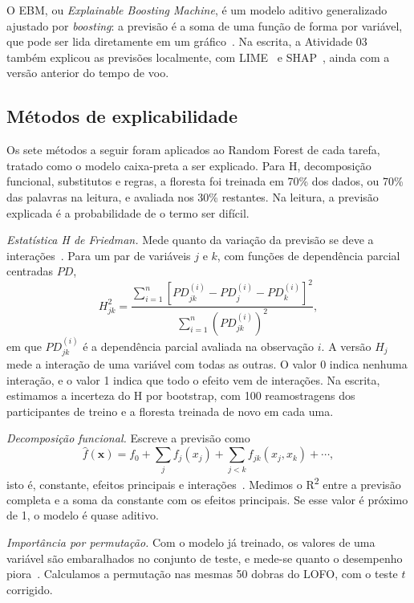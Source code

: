 \documentclass[conference]{IEEEtran}
\newcommand{\RF}{Random Forest}
\newcommand{\Rdois}{R\textsuperscript{2}}
\begin{document}
O EBM, ou \emph{Explainable Boosting Machine}, é um modelo aditivo generalizado
ajustado por \emph{boosting}: a previsão é a soma de uma função de forma por
variável, que pode ser lida diretamente em um gráfico~\cite{nori2019interpretml}.
Na escrita, a Atividade 03 também explicou as previsões localmente, com
LIME~\cite{ribeiro2016lime} e SHAP~\cite{lundberg2017shap}, ainda com a versão
anterior do tempo de voo.

\subsection{Métodos de explicabilidade}

Os sete métodos a seguir foram aplicados ao \RF{} de cada tarefa, tratado como
o modelo caixa-preta a ser explicado. Para H, decomposição funcional,
substitutos e regras, a floresta foi treinada em 70\% dos dados, ou 70\% das
palavras na leitura, e avaliada nos 30\% restantes. Na leitura, a previsão
explicada é a probabilidade de o termo ser difícil.

\emph{Estatística H de Friedman.} Mede quanto da variação da previsão se deve
a interações~\cite{friedman2008rulefit}. Para um par de variáveis $j$ e $k$,
com funções de dependência parcial centradas $PD$,
\begin{equation}
H^2_{jk} = \frac{\sum_{i=1}^{n}\left[PD^{(i)}_{jk} - PD^{(i)}_{j} - PD^{(i)}_{k}\right]^2}{\sum_{i=1}^{n} \left(PD^{(i)}_{jk}\right)^2},
\end{equation}
em que $PD^{(i)}_{jk}$ é a dependência parcial avaliada na observação $i$. A
versão $H_j$ mede a interação de uma variável com todas as outras. O valor 0
indica nenhuma interação, e o valor 1 indica que todo o efeito vem de
interações. Na escrita, estimamos a incerteza do H por bootstrap, com 100
reamostragens dos participantes de treino e a floresta treinada de novo em cada
uma.

\emph{Decomposição funcional.} Escreve a previsão como
\begin{equation}
\hat f(\mathbf{x}) = f_0 + \sum_{j} f_j(x_j) + \sum_{j<k} f_{jk}(x_j,x_k) + \cdots,
\end{equation}
isto é, constante, efeitos principais e
interações~\cite{hooker2004additive,molnar2022}. Medimos o \Rdois{} entre a
previsão completa e a soma da constante com os efeitos principais. Se esse
valor é próximo de 1, o modelo é quase aditivo.

\emph{Importância por permutação.} Com o modelo já treinado, os valores de uma
variável são embaralhados no conjunto de teste, e mede-se quanto o desempenho
piora~\cite{breiman2001rf,fisher2019all}. Calculamos a permutação nas mesmas 50
dobras do LOFO, com o teste $t$ corrigido.
\end{document}
